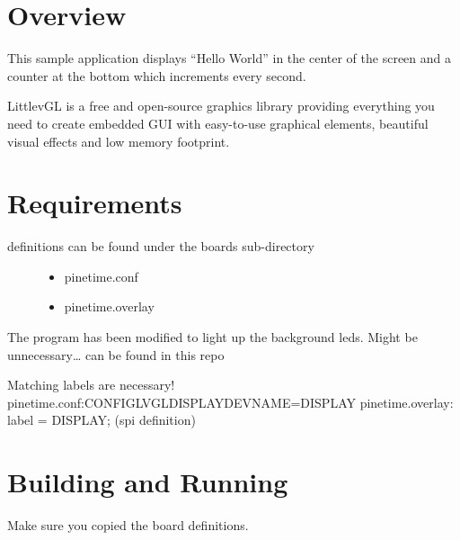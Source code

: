 \documentclass[letterpaper,10pt,english]{sphinxmanual}
\begin{document}
\section{Overview}
\label{\detokenize{lvgl:overview}}
This sample application displays “Hello World” in the center of the screen
and a counter at the bottom which increments every second.

LittlevGL is a free and open-source graphics library providing everything you need to create embedded GUI with easy-to-use graphical elements, beautiful visual effects and low memory footprint.


\section{Requirements}
\label{\detokenize{lvgl:requirements}}\begin{description}
\item[{definitions can be found under the boards sub-directory}] \leavevmode\begin{itemize}
\item {} 
pinetime.conf

\item {} 
pinetime.overlay

\end{itemize}

\end{description}

The program has been modified to light up the background leds.
Might be unnecessary…
can be found in this repo

\begin{sphinxVerbatim}[commandchars=\\\{\}]
Matching labels are necessary!
pinetime.conf:CONFIG\PYGZus{}LVGL\PYGZus{}DISPLAY\PYGZus{}DEV\PYGZus{}NAME=\PYGZdq{}DISPLAY\PYGZdq{}
pinetime.overlay:               label = \PYGZdq{}DISPLAY\PYGZdq{}; (spi definition)
\end{sphinxVerbatim}


\section{Building and Running}
\label{\detokenize{lvgl:building-and-running}}
Make sure you copied the board definitions.

\begin{sphinxVerbatim}[commandchars=\\\{\}]
\end{sphinxVerbatim}
\end{document}
